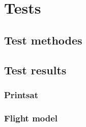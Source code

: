 \chapter{Tests}
\label{tests}
\section{Test methodes}

\section{Test results}
\subsection{Printsat}
\subsection{Flight model}